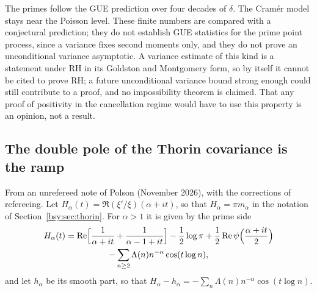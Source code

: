 \begin{table}[h]\centering\small
{}
\caption{$V_\delta$ for the primes, the GUE prediction, the Cram\'er model and the Poisson level (computed). The source printed $10.19,7.69,5.34,4.06,3.23,1.10$ for the primes (all within two standard errors of these) and Cram\'er values $14.19$ to $15.22$ with a last entry $10.09$, which the recomputation does not reproduce.}\label{wt:tab:rig}
\end{table}

The primes follow the GUE prediction over four decades of $\delta$. The Cram\'er model stays near the Poisson level. These finite numbers are compared with a conjectural prediction; they do not establish GUE statistics for the prime point process, since a variance fixes second moments only, and they do not prove an unconditional variance asymptotic. A variance estimate of this kind is a statement under RH in its Goldston and Montgomery form, so by itself it cannot be cited to prove RH; a future unconditional variance bound strong enough could still contribute to a proof, and no impossibility theorem is claimed. That any proof of positivity in the cancellation regime would have to use this property is an opinion, not a result.

\subsection{The double pole of the Thorin covariance is the ramp}\label{wt:sec:cov}

From an unrefereed note of Polson (November 2026), with the corrections of refereeing. Let $H_\alpha(t)=\Re(\xi'/\xi)(\alpha+it)$, so that $H_\alpha=\pi m_\alpha$ in the notation of Section~\ref{bsy:sec:thorin}. For $\alpha>1$ it is given by the prime side
\begin{multline*}
H_\alpha(t)=\Re\Bigl[\frac1{\alpha+it}+\frac1{\alpha-1+it}\Bigr]-\frac12\log\pi+\frac12\Re\psi\Bigl(\frac{\alpha+it}2\Bigr)\\
-\sum_{n\ge2}\Lambda(n)n^{-\alpha}\cos(t\log n),
\end{multline*}
and let $h_\alpha$ be its smooth part, so that $H_\alpha-h_\alpha=-\sum_n\Lambda(n)n^{-\alpha}\cos(t\log n)$.

